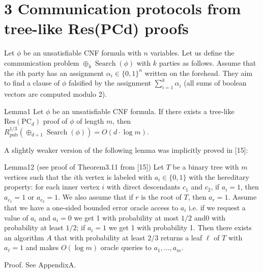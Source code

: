 \section*{3 Communication protocols from tree-like Res(PCd) proofs}
Let $\phi$ be an unsatisfiable CNF formula with $n$ variables. Let us define the communication problem $\oplus_k\operatorname{Search}(\phi)$ with $k$ parties as follows. Assume that the $i$th party has an assignment $\alpha_i\in\{0,1\}^n$ written on the forehead. They aim to find a clause of $\phi$ falsified by the assignment $\sum_{i=1}^k\alpha_i$ (all sums of boolean vectors are computed modulo 2).
\begin{authorclaim}{Lemma1}
Let $\phi$ be an unsatisfiable CNF formula. If there exists a tree-like $\mathrm{Res}(\mathrm{PC}_d)$ proof of $\phi$ of length $m$, then $R^{1/3}_{\mathrm{pub}}(\oplus_{d+1}\operatorname{Search}(\phi))=O(d\cdot\log m)$.
\end{authorclaim}
A slightly weaker version of the following lemma was implicitly proved in [15]:
\begin{authorclaim}{Lemma12 (see proof of Theorem3.11 from [15])}
Let $T$ be a binary tree with $m$ vertices such that the $i$th vertex is labeled with $a_i\in\{0,1\}$ with the hereditary property: for each inner vertex $i$ with direct descendants $c_1$ and $c_2$, if $a_i=1$, then $a_{c_1}=1$ or $a_{c_2}=1$. We also assume that if $r$ is the root of $T$, then $a_r=1$. Assume that we have a one-sided bounded error oracle access to $a_i$ i.e. if we request a value of $a_i$ and $a_i=0$ we get 1 with probability at most $1/2$ and0 with probability at least $1/2$; if $a_i=1$ we get 1 with probability 1. Then there exists an algorithm $A$ that with probability at least $2/3$ returns a leaf $\ell$ of $T$ with $a_\ell=1$ and makes $O(\log m)$ oracle queries to $a_1,\ldots,a_m$.
\end{authorclaim}
Proof. See AppendixA.
